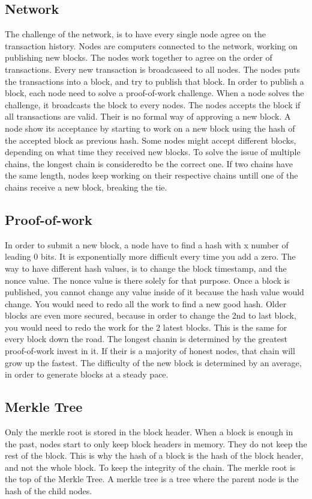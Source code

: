 \subsection{Network}
The challenge of the network, is to have every single node agree on the transaction history. Nodes are computers connected to the network,
working on publishing new blocks. The nodes work together to agree on the order of transactions. Every new transaction is broadcaseed to all nodes.
The nodes puts the transactions into a block, and try to publish that block. In order to publish a block, each node need to solve a proof-of-work challenge.
When a node solves the challenge, it broadcasts the block to every nodes. The nodes accepts the block if all transactions are valid. Their is no formal
way of approving a new block. A node show its acceptance by starting to work on a new block using the hash of the accepted block as previous hash.
Some nodes might accept different blocks, depending on what time they received new blocks. To solve the issue of multiple chains, the longest chain is consideredto be the correct one. 
If two chains have the same length, nodes keep working on their respective chains untill one of the chains receive a new block, breaking the tie.


\subsection{Proof-of-work}
In order to submit a new block, a node have to find a hash with x number of leading 0 bits.
It is exponentially more difficult every time you add a zero. The way to have different hash values, is to change the block timestamp, and the nonce value.
The nonce value is there solely for that purpose. Once a block is published, you cannot change any value inside of it because the hash value would change.
You would need to redo all the work to find a new good hash. Older blocks are even more secured, because in order to change the 2nd to last block, you would need to redo the work
for the 2 latest blocks. This is the same for every block down the road. The longest chanin is determined by the greatest proof-of-work invest in it. If their is a majority of honest nodes,
that chain will grow up the fastest. The difficulty of the new block is determined by an average, in order to generate blocks at a steady pace.


\subsection{Merkle Tree}
Only the merkle root is stored in the block header. When a block is enough in the past, nodes start to only keep block headers in memory.
They do not keep the rest of the block. This is why the hash of a block is the hash of the block header, and not the whole block. To keep the integrity of the chain.
The merkle root is the top of the Merkle Tree. A merkle tree is a tree where the parent node is the hash of the child nodes.

